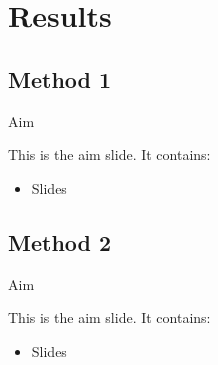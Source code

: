 \section{Results}

    \subsection{Method 1}
    
        \begin{frame}{Aim}
        
            This is the aim slide.
            It contains:
            
            \begin{itemize}
            \item Slides
            \end{itemize}
        
        \end{frame}
        
        
    \subsection{Method 2}
    
        \begin{frame}{Aim}
        
            This is the aim slide.
            It contains:
            
            \begin{itemize}
            \item Slides
            \end{itemize}
        
        \end{frame}
